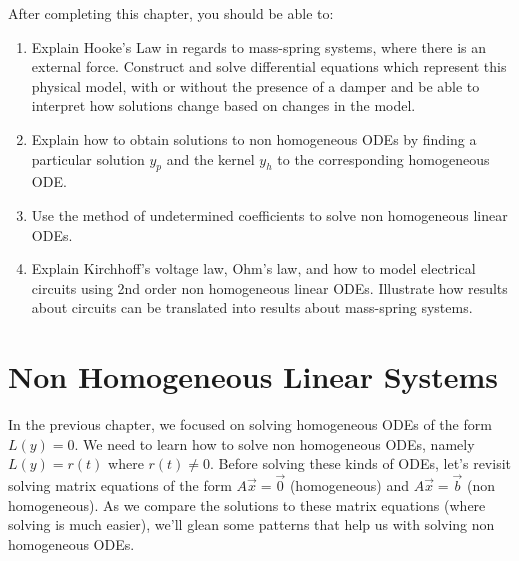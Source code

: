 
After completing this chapter, you should be able to:

\begin{enumerate}
 \item Explain Hooke's Law in regards to mass-spring systems, where there is an external force. Construct and solve differential equations which represent this physical model, with or without the presence of a damper and be able to interpret how solutions change based on changes in the model. 
 \item Explain how to obtain solutions to non homogeneous ODEs by finding a particular solution $y_p$ and the kernel $y_h$ to the corresponding homogeneous ODE. 
 \item Use the method of undetermined coefficients to solve non homogeneous linear ODEs.
 \item Explain Kirchhoff's voltage law, Ohm's law, and how to model electrical circuits using 2nd order non homogeneous linear ODEs.  Illustrate how results about circuits can be translated into results about mass-spring systems.
\end{enumerate}



\section{Non Homogeneous Linear Systems}
In the previous chapter, we focused on solving homogeneous ODEs of the form $L(y) = 0$. We need to learn how to solve non homogeneous ODEs, namely $L(y) = r(t)$ where $r(t)\neq 0$. Before solving these kinds of ODEs, let's revisit solving matrix equations of the form $A\vec x=\vec 0$ (homogeneous) and $A\vec x = \vec b$ (non homogeneous).  As we compare the solutions to these matrix equations (where solving is much easier), we'll glean some patterns that help us with solving non homogeneous ODEs.


